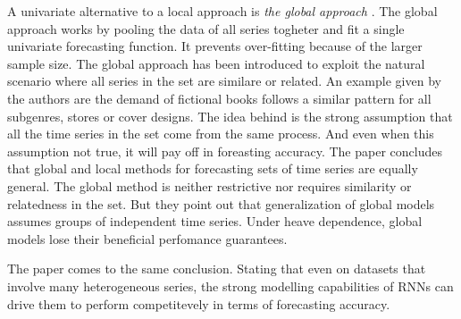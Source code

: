 A univariate alternative to a local approach is \textit{the global approach}
\citep{Rabanser2020}.
The global approach works by pooling the data of all series togheter and fit a single univariate forecasting function. It prevents over-fitting because of the larger sample size.
The global approach has been introduced to exploit the natural scenario where all series
in the set are similare or related. An example given by the authors are the demand of fictional
books follows a similar pattern for all subgenres, stores or cover designs.
The idea behind is the strong assumption that all the time series in the set
come from the same process.
And even when this assumption not true, it will pay off in foreasting accuracy.
The paper \cite{Rabanser2020} concludes that global and local methods for forecasting
sets of time series are equally general. The global method is neither restrictive nor requires
similarity or relatedness in the set.
But they point out that generalization of global models assumes groups of independent time series.
Under heave dependence, global models lose their beneficial perfomance guarantees. 

The paper \cite{Hewamalage2021} comes to the same conclusion. Stating that 
even on datasets that involve many heterogeneous series, the strong modelling capabilities of RNNs can drive
them to perform competitevely in terms of forecasting accuracy.


%
